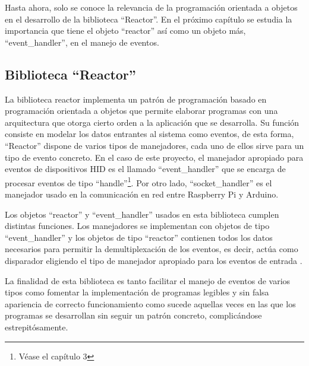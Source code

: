 
    
Hasta ahora, solo se conoce la relevancia de la programación orientada a objetos en el desarrollo de la biblioteca ``Reactor''. En el próximo capítulo se estudia la importancia que tiene el objeto ``reactor'' así como un objeto más, ``event\_handler'', en el manejo de eventos.
    
\subsection{Biblioteca ``Reactor''}\label{s2_1_6}

La biblioteca reactor implementa un patrón de programación basado en programación orientada a objetos que permite elaborar programas con una arquitectura que otorga cierto orden a la aplicación que se desarrolla. Su función consiste en modelar los datos entrantes al sistema como eventos, de esta forma, ``Reactor'' dispone de varios tipos de manejadores, cada uno de ellos sirve para un tipo de evento concreto. En el caso de este proyecto, el manejador apropiado para eventos de dispositivos HID es el llamado ``event\_handler'' que se encarga de procesar eventos de tipo ``handle''\footnote{Véase el capítulo 3}. Por otro lado, ``socket\_handler'' es el manejador usado en la comunicación en red entre Raspberry Pi y Arduino. 

Los objetos ``reactor'' y ``event\_handler'' usados en esta biblioteca cumplen distintas funciones. Los manejadores se implementan con objetos de tipo ``event\_handler'' y los objetos de tipo ``reactor'' contienen todos los datos necesarios para permitir la demultiplexación de los eventos, es decir, actúa como disparador eligiendo el tipo de manejador apropiado para los eventos de entrada \citep[pág. 97--100]{tallerRPi}.

La finalidad de esta biblioteca es tanto facilitar el manejo de eventos de varios tipos como fomentar la implementación de programas legibles y sin falsa apariencia de correcto funcionamiento como sucede aquellas veces en las que los programas se desarrollan sin seguir un patrón concreto, complicándose estrepitósamente.













